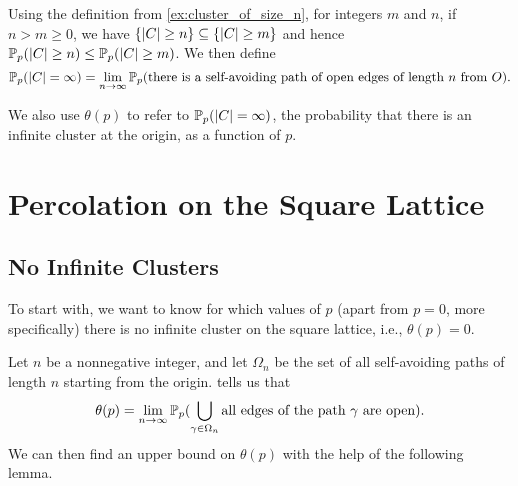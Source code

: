 \documentclass[a4paper, 12pt]{article}
\begin{document}
\begin{cor}\label{cor:inf_cluster}
Using the definition from \cref{ex:cluster_of_size_n}, for integers $m$ and $n$, if $n > m \geq 0$, we have $\{\lvert C \rvert \geq n\} \subseteq \{\lvert C \rvert \geq m\}$ and hence $\mathbb{P}_p(\lvert C \rvert \geq n) \leq \mathbb{P}_p(\lvert C \rvert \geq m)$. We then define
\[
\mathbb{P}_p(\lvert C \rvert = \infty) 
= \lim_{n \to \infty} \mathbb{P}_p(\text{there is a self-avoiding path of open edges of length } n \text{ from } O).
\]
\end{cor}
We also use $\theta(p)$ to refer to $\mathbb{P}_p(\lvert C \rvert = \infty)$, the probability that there is an infinite cluster at the origin, as a function of $p$.

\pagebreak
\section{Percolation on the Square Lattice}\label{sec:Z2}
\subsection{No Infinite Clusters}\label{subsec:no_inf_cluster}
To start with, we want to know for which values of $p$ (apart from $p = 0$, more specifically) there is no infinite cluster on the square lattice, i.e., $\theta(p) = 0$.

Let $n$ be a nonnegative integer, and let $\Omega_n$ be the set of all self-avoiding paths of length $n$ starting from the origin.  tells us that
\[\theta(p) = \lim_{n \to \infty} \mathbb{P}_p(\bigcup_{\gamma \in \Omega_n} \text{all edges of the path } \gamma \text{ are open}).\]
We can then find an upper bound on $\theta(p)$ with the help of the following lemma.
\end{document}
